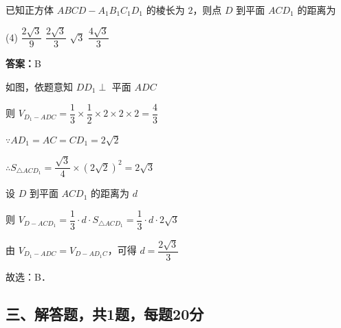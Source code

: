 \begin{example}[\bkstar{3}{5}]
已知正方体 $ABCD-A_1B_1C_1D_1$ 的棱长为 $2$，则点 $D$ 到平面 $ACD_1$ 的距离为
\begin{tasks}(4)
    \task $\dfrac{2\sqrt{3}}{9}$
    \task $\dfrac{2\sqrt{3}}{3}$
    \task $\sqrt{3}$
    \task $\dfrac{4\sqrt{3}}{3}$
\end{tasks}
\end{example}
\begin{solution}
\textbf{答案：}B

如图，依题意知 $DD_1\perp$ 平面 $ADC$

则 $V_{D_1-ADC}=\dfrac{1}{3}\times\dfrac{1}{2}\times 2\times 2\times 2=\dfrac{4}{3}$

$\because AD_1=AC=CD_1=2\sqrt{2}$

$\therefore S_{\triangle ACD_1}=\dfrac{\sqrt{3}}{4}\times\left(2\sqrt{2}\right)^2=2\sqrt{3}$

设 $D$ 到平面 $ACD_1$ 的距离为 $d$

则 $V_{D-ACD_1}=\dfrac{1}{3}\cdot d\cdot S_{\triangle ACD_1}=\dfrac{1}{3}\cdot d\cdot 2\sqrt{3}$

由 $V_{D_1-ADC}=V_{D-AD_1C}$，可得 $d=\dfrac{2\sqrt{3}}{3}$

故选：B．
\end{solution}

\vspace{2em}
\subsection{三、解答题，共1题，每题20分}

